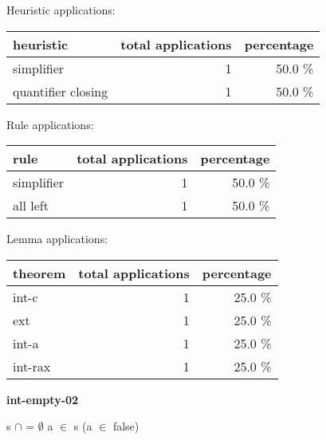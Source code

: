 \documentclass[a4paper]{article}
\begin{document}
\medskip


Heuristic applications:

\begin{supertabular}{l|r|r}
heuristic	& total applications & percentage \\ \hline
simplifier & 1 & 50.0 \% \\
quantifier closing & 1 & 50.0 \% \\

\end{supertabular}

Rule applications:

\begin{supertabular}{l|r|r}
rule	        & total applications & percentage \\ \hline
simplifier & 1 & 50.0 \% \\
all left & 1 & 50.0 \% \\

\end{supertabular}

Lemma applications:

\begin{supertabular}{l|r|r}
theorem	        & total applications & percentage \\ \hline
int-c & 1 & 25.0 \% \\
ext & 1 & 25.0 \% \\
int-a & 1 & 25.0 \% \\
int-rax & 1 & 25.0 \% \\

\end{supertabular}
\pagebreak

{\LARGE\bf int-empty-02}\label{lemma-int-empty-02}

\medskip

 \Fol s $\cap$  = $\emptyset$ \And a $\in$ s \Imp (\Not \Not a $\in$  \Equiv false)
\end{document}
